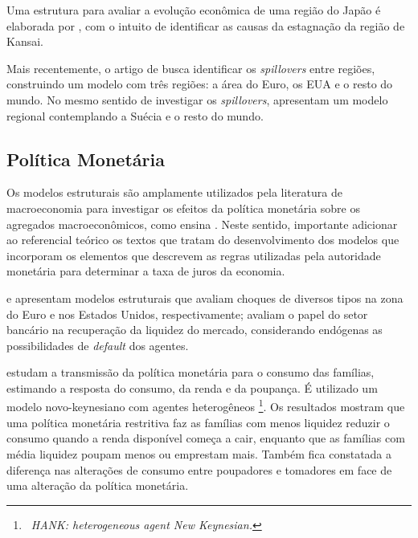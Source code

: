 \documentclass[12pt]{article}
\numberwithin{equation}{section}
\theoremstyle{definition}
\begin{document}
Uma estrutura para avaliar a evolução econômica de uma região do Japão é elaborada por \textcite{okano_development_2015}, com o intuito de identificar as causas da estagnação da região de Kansai.

Mais recentemente, o artigo de \textcite{croitorov_financial_2020} busca identificar os \textit{spillovers}\footnotemark{}  entre regiões, construindo um modelo com três regiões: a área do Euro, os EUA e o resto do mundo. No mesmo sentido de investigar os \textit{spillovers}, \textcite{corbo_maja_2020} apresentam um modelo regional contemplando a Suécia e o resto do mundo.

\subsection{Política Monetária}

Os modelos estruturais são amplamente utilizados pela literatura de macroeconomia para investigar os efeitos da política monetária sobre os agregados macroeconômicos, como ensina \textcite{gali_monetary_2015}. Neste sentido, importante adicionar ao referencial teórico os textos que tratam do desenvolvimento dos modelos que incorporam os elementos que descrevem as regras utilizadas pela autoridade monetária para determinar a taxa de juros da economia.

\textcite{smets_estimated_2003} e \textcite{smets_shocks_2007} apresentam modelos estruturais que avaliam choques de diversos tipos na zona do Euro e nos Estados Unidos, respectivamente; \textcite{walque_financial_2010} avaliam o papel do setor bancário na recuperação da liquidez do mercado, considerando endógenas as possibilidades de \textit{default} dos agentes.

\textcite{holm_transmission_2021} estudam a transmissão da política monetária para o consumo das famílias, estimando a resposta do consumo, da renda e da poupança. É utilizado um modelo novo-keynesiano com agentes heterogêneos \footnote{$\,$ \textit{HANK: heterogeneous agent New Keynesian.}}. Os resultados mostram que uma política monetária restritiva faz as famílias com menos liquidez reduzir o consumo quando a renda disponível começa a cair, enquanto que as famílias com média liquidez poupam menos ou emprestam mais. Também fica constatada a diferença nas alterações de consumo entre poupadores e tomadores em face de uma alteração da política monetária.
\end{document}
